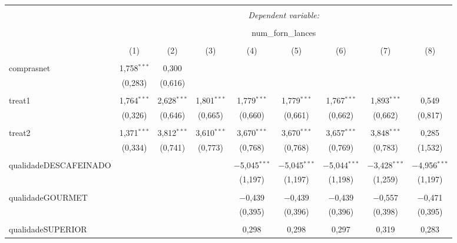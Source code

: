 
\begin{table}[!htbp] \centering 
  \caption{} 
  \label{} 
\begin{tabular}{@{\extracolsep{5pt}}lcccccccc} 
\\[-1.8ex]\hline 
\hline \\[-1.8ex] 
 & \multicolumn{8}{c}{\textit{Dependent variable:}} \\ 
\cline{2-9} 
\\[-1.8ex] & \multicolumn{8}{c}{num\_forn\_lances} \\ 
\\[-1.8ex] & (1) & (2) & (3) & (4) & (5) & (6) & (7) & (8)\\ 
\hline \\[-1.8ex] 
 comprasnet & 1,758$^{***}$ & 0,300 &  &  &  &  &  &  \\ 
  & (0,283) & (0,616) &  &  &  &  &  &  \\ 
  & & & & & & & & \\ 
 treat1 & 1,764$^{***}$ & 2,628$^{***}$ & 1,801$^{***}$ & 1,779$^{***}$ & 1,779$^{***}$ & 1,767$^{***}$ & 1,893$^{***}$ & 0,549 \\ 
  & (0,326) & (0,646) & (0,665) & (0,660) & (0,661) & (0,662) & (0,662) & (0,817) \\ 
  & & & & & & & & \\ 
 treat2 & 1,371$^{***}$ & 3,812$^{***}$ & 3,610$^{***}$ & 3,670$^{***}$ & 3,670$^{***}$ & 3,657$^{***}$ & 3,848$^{***}$ & 0,285 \\ 
  & (0,334) & (0,741) & (0,773) & (0,768) & (0,768) & (0,769) & (0,783) & (1,532) \\ 
  & & & & & & & & \\ 
 qualidadeDESCAFEINADO &  &  &  & $-$5,045$^{***}$ & $-$5,045$^{***}$ & $-$5,044$^{***}$ & $-$3,428$^{***}$ & $-$4,956$^{***}$ \\ 
  &  &  &  & (1,197) & (1,197) & (1,198) & (1,259) & (1,197) \\ 
  & & & & & & & & \\ 
 qualidadeGOURMET &  &  &  & $-$0,439 & $-$0,439 & $-$0,439 & $-$0,557 & $-$0,471 \\ 
  &  &  &  & (0,395) & (0,396) & (0,396) & (0,398) & (0,395) \\ 
  & & & & & & & & \\ 
 qualidadeSUPERIOR &  &  &  & 0,298 & 0,298 & 0,297 & 0,319 & 0,283 \\ 

\end{tabular}
\end{table}
